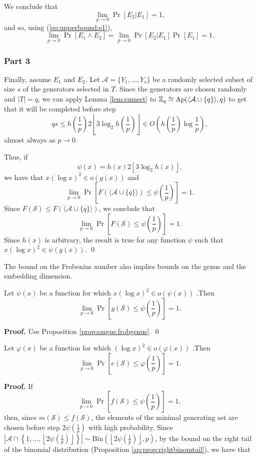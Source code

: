 \par We conclude that
\[\lim_{p \to 0} \Pr[E_2 | E_1] = 1,\]
and so, using (\ref{eq:upperbound:e1}),
\[\lim_{p \to 0} \Pr[E_1 \land E_2] = \lim_{p \to 0} \Pr[E_2  | E_1]\Pr[E_1] = 1.\]


\subsubsection*{Part 3}

\par Finally, assume $E_1$ and $E_2$. Let $\mathcal{A} = \{Y_{1}, \ldots, Y_{s}\}$ be a randomly selected subset of size $s$ of the generators selected in $T$.  Since the generators are chosen randomly and $|T| = q$, we can apply Lemma \ref{lem:sumset} to $\mathbb{Z}_q \cong \mathrm{Ap}(\langle\mathcal{A}\cup\{q\}\rangle, q)$ to get that it will be completed before step \[ qs\leq h\left(\frac{1}{p}\right)2\left\lfloor 3\log_2 h\left(\frac{1}{p}\right)\right\rfloor \in O\left(h\left(\frac{1}{p}\right)\log \frac{1}{p}\right),\]
almost always as $p \to 0$. 
\par Thus, if
\[\psi(x) = h\left(x\right)2\left\lfloor 3\log_2 h\left(x\right)\right\rfloor,\]
we have that $x(\log x)^2 \in o(g(x))$ and
\[\lim_{p \to  0} \Pr\left[F(\langle\mathcal{A}\cup \{q\}\rangle) \leq \psi\left(\frac{1}{p}\right)\right] = 1.\]
Since $F(\mathcal{S}) \leq F(\langle \mathcal{A}\cup\{q\}\rangle)$, we conclude that
\[\lim_{p \to 0}\Pr\left[F(\mathcal{S}) \leq \psi\left(\frac{1}{p}\right)\right] = 1.\]
Since $h(x)$ is arbitrary, the result is true for any function $\psi$ such that $x(\log x)^2 \in \psi(g(x))$. \qed \par
The bound on the Frobenius number also implies bounds on the genus and the embedding dimension.
\begin{corollary}
    Let $\psi(x)$ be a function for which $x(\log x)^2 \in o(\psi(x))$ .Then
    \[\lim_{p \to 0}\Pr\left[g(\mathcal{S}) \leq \psi\left(\frac{1}{p}\right)\right] = 1.\]
\end{corollary}
\textbf{Proof. } Use Proposition \ref{prop:smgps:frobgenus}. \qed
\begin{corollary}
    Let $\varphi(x)$ be a function for which $(\log x)^2 \in o(\varphi(x))$ .Then
    \[\lim_{p \to 0}\Pr\left[e(\mathcal{S}) \leq \varphi\left(\frac{1}{p}\right)\right] = 1.\]
\end{corollary}
\textbf{Proof. } If
\[\lim_{p \to 0}\Pr\left[f(\mathcal{S}) \leq \psi\left(\frac{1}{p}\right)\right] = 1,\]
then, since $m(\mathcal{S})\leq f(\mathcal{S})$, the elements of the minimal generating set are chosen before step $2\psi\left(\frac{1}{p}\right)$ with high probability. Since $\left|\mathcal{A}\cap\left\{1, \ldots, \left\lfloor2\psi\left(\frac{1}{p}\right)\right \rfloor\right\}\right| \sim \mathrm{Bin}\left(\left\lfloor2\psi\left(\frac{1}{p}\right)\right \rfloor, p\right)$, by the bound on the right tail of the binomial distribution (Proposition \ref{ap:prop:rightbinomtail}), we have that
